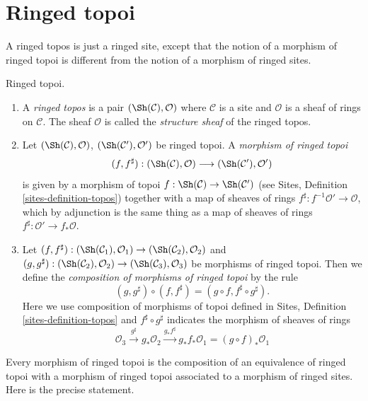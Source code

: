 \section{Ringed topoi}
\label{section-ringed-topoi}

\noindent
A ringed topos is just a ringed site, except that the notion of
a morphism of ringed topoi is different from the notion of a morphism
of ringed sites.

\begin{definition}
\label{definition-ringed-topos}
Ringed topoi.
\begin{enumerate}
\item A {\it ringed topos} is a pair
$(\Sh(\mathcal{C}), \mathcal{O})$
where $\mathcal{C}$ is a site and $\mathcal{O}$ is a sheaf of rings
on $\mathcal{C}$. The sheaf $\mathcal{O}$ is called the
{\it structure sheaf} of the ringed topos.
\item Let $(\Sh(\mathcal{C}), \mathcal{O})$,
$(\Sh(\mathcal{C}'), \mathcal{O}')$ be ringed topoi.
A {\it morphism of ringed topoi}
$$
(f, f^\sharp) :
(\Sh(\mathcal{C}), \mathcal{O})
\longrightarrow
(\Sh(\mathcal{C}'), \mathcal{O}')
$$
is given by a morphism of topoi $f : \Sh(\mathcal{C}) \to \Sh(\mathcal{C}')$
(see Sites, Definition \ref{sites-definition-topos})
together with a map of sheaves of rings
$f^\sharp : f^{-1}\mathcal{O}' \to \mathcal{O}$, which by adjunction
is the same thing as a map of sheaves of rings
$f^\sharp : \mathcal{O}' \to f_*\mathcal{O}$.
\item Let
$(f, f^\sharp) :
(\Sh(\mathcal{C}_1), \mathcal{O}_1)
\to (\Sh(\mathcal{C}_2), \mathcal{O}_2)$ and
$(g, g^\sharp) :
(\Sh(\mathcal{C}_2), \mathcal{O}_2) \to
(\Sh(\mathcal{C}_3), \mathcal{O}_3)$
be morphisms of ringed topoi. Then we define
the {\it composition of morphisms of ringed topoi}
by the rule
$$
(g, g^\sharp) \circ (f, f^\sharp) = (g \circ f, f^\sharp \circ g^\sharp).
$$
Here we use composition of morphisms of topoi defined in
Sites, Definition \ref{sites-definition-topos}
and $f^\sharp \circ g^\sharp$ indicates the morphism of sheaves of
rings
$$
\mathcal{O}_3 \xrightarrow{g^\sharp} g_*\mathcal{O}_2
\xrightarrow{g_*f^\sharp} g_*f_*\mathcal{O}_1 = (g \circ f)_*\mathcal{O}_1
$$
\end{enumerate}
\end{definition}

\noindent
Every morphism of ringed topoi is the composition of an equivalence
of ringed topoi with a morphism of ringed topoi associated to a morphism
of ringed sites. Here is the precise statement.

